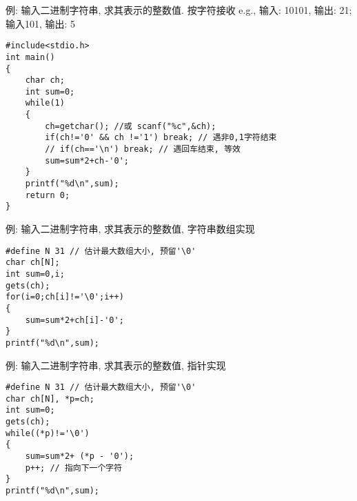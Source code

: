 \begin{frame}{\small 例: 输入二进制字符串, 求其表示的整数值. 按字符接收}
e.g., 输入: 10101, 输出: 21; \quad 输入101, 输出:  5
\begin{lstlisting}
#include<stdio.h>
int main()
{
	char ch;
	int sum=0;
	while(1)
	{
		ch=getchar(); //或 scanf("%c",&ch);
		if(ch!='0' && ch !='1') break; // 遇非0,1字符结束
		// if(ch=='\n') break; // 遇回车结束, 等效
		sum=sum*2+ch-'0'; 
	} 
	printf("%d\n",sum);
	return 0;
}
\end{lstlisting}
\end{frame}

\begin{frame}[fragile]{\small 例: 输入二进制字符串, 求其表示的整数值, 字符串数组实现}
\begin{lstlisting}
#define N 31 // 估计最大数组大小, 预留'\0'
char ch[N];
int sum=0,i;
gets(ch);
for(i=0;ch[i]!='\0';i++)
{
	sum=sum*2+ch[i]-'0';
} 
printf("%d\n",sum);
\end{lstlisting}
\end{frame}

\begin{frame}[fragile]{\small 例: 输入二进制字符串, 求其表示的整数值, 指针实现}
\begin{lstlisting}
#define N 31 // 估计最大数组大小, 预留'\0'
char ch[N], *p=ch;
int sum=0;
gets(ch);
while((*p)!='\0')
{
	sum=sum*2+ (*p - '0');
	p++; // 指向下一个字符
} 
printf("%d\n",sum);
\end{lstlisting}
\end{frame}







